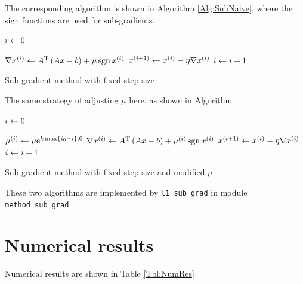\documentclass[english]{pkupaper}
\begin{document}
\begin{thmquestion}[3 (b)]
The corresponding algorithm is shown in Algorithm \ref{Alg:SubNaive}, where the sign functions are used for sub-gradients.

\begin{algorithm}
\SetAlgoLined


$ i \leftarrow 0 $\;

{
	$ \nabla x^{\left( i \right)} \leftarrow A^{\mathrm{T}} \left(  A x - b  \right) + \mu \operatorname{\mathrm{sgn}} x^{\left( i \right)} $\;
	$ x^{\left(  i + 1  \right)} \leftarrow x^{\left( i \right)} - \eta \nabla x^{\left( i \right)} $\;
	$ i \leftarrow i + 1 $\;
}

\caption{Sub-gradient method with fixed step size} \label{Alg:SubNaive}
\end{algorithm}

The same strategy of adjusting $\mu$ here, as shown in Algorithm \label{Alg:SubExpReg}.

\begin{algorithm}
\SetAlgoLined


$ i \leftarrow 0 $\;

{
	$ \mu^{\left( i \right)} \leftarrow \mu \mathrm{e}^{ k \max \left\{  i_0 - i  \right\}, 0 } $\;
	$ \nabla x^{\left( i \right)} \leftarrow A^{\mathrm{T}} \left(  A x - b  \right) + \mu^{\left( i \right)} \operatorname{\mathrm{sgn}} x^{\left( i \right)} $\;
	$ x^{\left(  i + 1  \right)} \leftarrow x^{\left( i \right)} - \eta \nabla x^{\left( i \right)} $\;
	$ i \leftarrow i + 1 $\;
}

\caption{Sub-gradient method with fixed step size and modified $\mu$} \label{Alg:SubExpReg}
\end{algorithm}

These two algorithms are implemented by \verb"l1_sub_grad" in module \verb"method_sub_grad".
\end{thmquestion}

\section{Numerical results}

Numerical results are shown in Table \ref{Tbl:NumRes}
\end{document}
